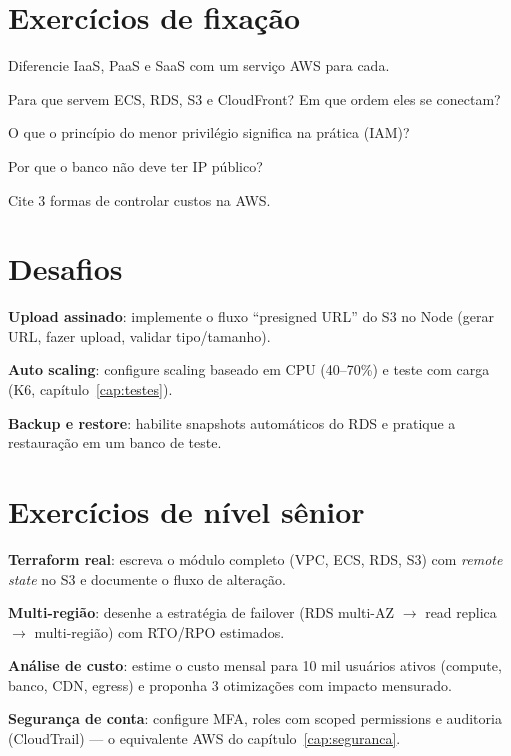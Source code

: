 \section{Exercícios de fixação}

\begin{exercicios}
  \item Diferencie IaaS, PaaS e SaaS com um serviço AWS para cada.
  \item Para que servem ECS, RDS, S3 e CloudFront? Em que ordem eles se conectam?
  \item O que o princípio do menor privilégio significa na prática (IAM)?
  \item Por que o banco não deve ter IP público?
  \item Cite 3 formas de controlar custos na AWS.
\end{exercicios}

\section{Desafios}

\begin{desafios}
  \item \textbf{Upload assinado}: implemente o fluxo ``presigned URL'' do S3 no Node (gerar URL, fazer upload, validar tipo/tamanho).
  \item \textbf{Auto scaling}: configure scaling baseado em CPU (40--70\%) e teste com carga (K6, capítulo~\ref{cap:testes}).
  \item \textbf{Backup e restore}: habilite snapshots automáticos do RDS e pratique a restauração em um banco de teste.
\end{desafios}

\section{Exercícios de nível sênior}

\begin{seniores}
  \item \textbf{Terraform real}: escreva o módulo completo (VPC, ECS, RDS, S3) com \emph{remote state} no S3 e documente o fluxo de alteração.
  \item \textbf{Multi-região}: desenhe a estratégia de failover (RDS multi-AZ $\rightarrow$ read replica $\rightarrow$ multi-região) com RTO/RPO estimados.
  \item \textbf{Análise de custo}: estime o custo mensal para 10 mil usuários ativos (compute, banco, CDN, egress) e proponha 3 otimizações com impacto mensurado.
  \item \textbf{Segurança de conta}: configure MFA, roles com scoped permissions e auditoria (CloudTrail) — o equivalente AWS do capítulo~\ref{cap:seguranca}.
\end{seniores}

